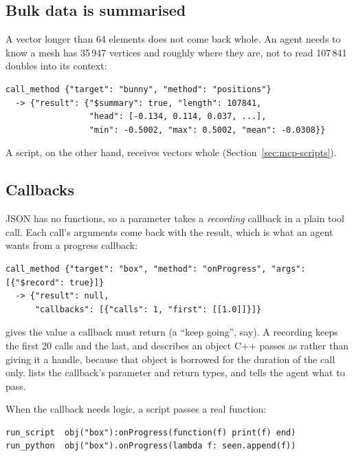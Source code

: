 \subsection*{Bulk data is summarised}

A vector longer than 64 elements does not come back whole. An agent needs to
know a mesh has 35\,947 vertices and roughly where they are, not to read 107\,841
doubles into its context:

\begin{lstlisting}[style=json]
call_method {"target": "bunny", "method": "positions"}
  -> {"result": {"$summary": true, "length": 107841,
                 "head": [-0.134, 0.114, 0.037, ...],
                 "min": -0.5002, "max": 0.5002, "mean": -0.0308}}
\end{lstlisting}

A script, on the other hand, receives vectors whole
(Section~\ref{sec:mcp-scripts}).

\subsection*{Callbacks}
\label{sec:mcp-callbacks}

JSON has no functions, so a  parameter takes a
\emph{recording} callback in a plain tool call. Each call's arguments come back
with the result, which is what an agent wants from a progress callback:

\begin{lstlisting}[style=plain]
call_method {"target": "box", "method": "onProgress", "args": [{"$record": true}]}
  -> {"result": null,
      "callbacks": [{"calls": 1, "first": [[1.0]]}]}
\end{lstlisting}

 gives the value a callback must return (a 
``keep going'', say). A recording keeps the first 20 calls and the last, and
describes an object C++ passes as  rather
than giving it a handle, because that object is borrowed for the duration of
the call only.  lists the callback's parameter and
return types, and tells the agent what to pass.

When the callback needs logic, a script passes a real function:

\begin{lstlisting}[style=plain]
run_script  obj("box"):onProgress(function(f) print(f) end)
run_python  obj("box").onProgress(lambda f: seen.append(f))
\end{lstlisting}

